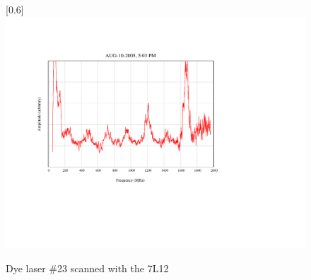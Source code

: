 \begin{figure}
\scalebox{0.8}[0.6]{
\includegraphics[viewport=150 200 300 450, bb=85 160 300 550]
{23-12/23-12.pdf}
}
\caption{Dye laser \#23 scanned with the 7L12}
\label{23-12}
\end{figure}
